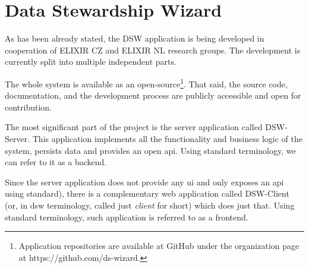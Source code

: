 \section{Data Stewardship Wizard}

As has been already stated, the DSW application is being developed in cooperation of ELIXIR CZ and ELIXIR NL research groups.
The development is currently split into multiple independent parts.

The whole system is available as an open-source\footnote{Application repositories are available at GitHub under the organization page at https://github.com/ds-wizard.}.
That said, the source code, documentation, and the development process are publicly accessible and open for contribution.

The most significant part of the project is the server application called DSW-Server.
This application implements all the functionality and business logic of the system, persists data and provides an open \gls{api}.
Using standard terminology, we can refer to it as a backend.

Since the server application does not provide any \gls{ui} and only exposes an \gls{api} using  standard), there is a complementary web application called DSW-Client (or, in \gls{dsw} terminology, called just \textit{client} for short) which does just that.
Using standard terminology, such application is referred to as a frontend.
